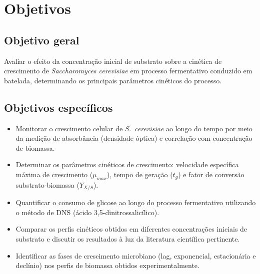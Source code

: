 
\section{Objetivos}

\subsection{Objetivo geral}

Avaliar o efeito da concentração inicial de substrato sobre a cinética de crescimento de \textit{Saccharomyces cerevisiae} em processo fermentativo conduzido em batelada, determinando os principais parâmetros cinéticos do processo.

\subsection{Objetivos específicos}

\begin{itemize}
    \item Monitorar o crescimento celular de \textit{S.\ cerevisiae} ao longo do tempo por meio da medição de absorbância (densidade óptica) e correlação com concentração de biomassa.
    \item Determinar os parâmetros cinéticos de crescimento: velocidade específica máxima de crescimento ($\mu_{max}$), tempo de geração ($t_g$) e fator de conversão substrato-biomassa ($Y_{X/S}$).
    \item Quantificar o consumo de glicose ao longo do processo fermentativo utilizando o método de DNS (ácido 3,5-dinitrossalicílico).
    \item Comparar os perfis cinéticos obtidos em diferentes concentrações iniciais de substrato e discutir os resultados à luz da literatura científica pertinente.
    \item Identificar as fases de crescimento microbiano (lag, exponencial, estacionária e declínio) nos perfis de biomassa obtidos experimentalmente.
\end{itemize}